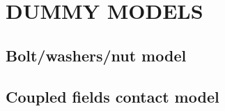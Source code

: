 \section{DUMMY MODELS}
\subsection{Bolt/washers/nut model}
\subsection{Coupled fields contact model}
